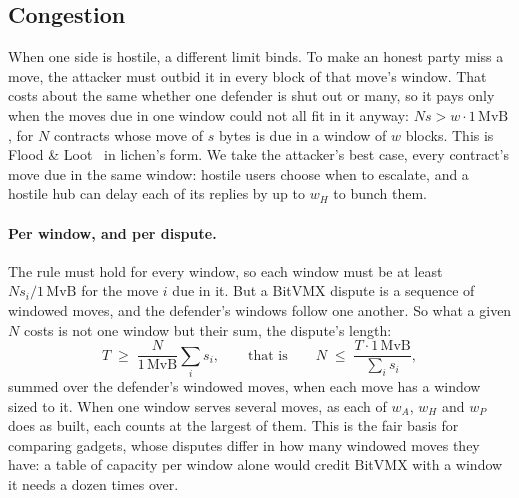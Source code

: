 \documentclass[11pt]{article}
\begin{document}
\subsection{Congestion}
\label{sec:congestion}

When one side is hostile, a different limit binds. To make an honest
party miss a move, the attacker must outbid it in every block of that
move's window. That costs about the same whether one defender is shut
out or many, so it pays only when the moves due in one window could not
all fit in it anyway: $N s > w \cdot 1\,\mathrm{MvB}$, for $N$ contracts
whose move of $s$ bytes is due in a window of $w$ blocks. This is
Flood \& Loot~\cite{floodloot} in lichen's form. We take the attacker's
best case, every contract's move due in the same window: hostile users
choose when to escalate, and a hostile hub can delay each of its replies
by up to $w_H$ to bunch them.

\paragraph{Per window, and per dispute.} The rule must hold for every
window, so each window must be at least $N s_i / 1\,\mathrm{MvB}$ for
the move $i$ due in it. But a BitVMX dispute is a sequence of windowed
moves, and the defender's windows follow one another. So what a given
$N$ costs is not one window but their sum, the dispute's length:
\[
  T \;\ge\; \frac{N}{1\,\mathrm{MvB}} \sum_i s_i ,
  \qquad\text{that is}\qquad
  N \;\le\; \frac{T \cdot 1\,\mathrm{MvB}}{\sum_i s_i},
\]
summed over the defender's windowed moves, when each move has a window
sized to it. When one window serves several moves, as each of $w_A$,
$w_H$ and $w_P$ does as built, each counts at the largest of them. This
is the fair basis for comparing gadgets, whose disputes differ in how
many windowed moves they have: a table of capacity per window alone
would credit BitVMX with a window it needs a dozen times over.
\end{document}
